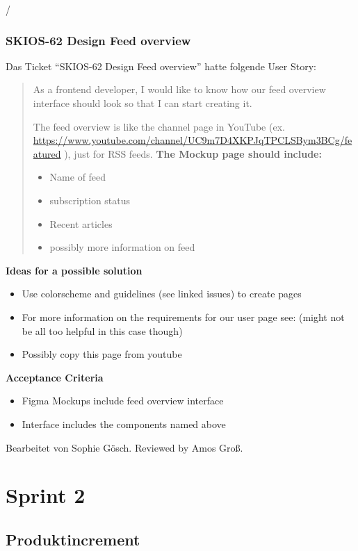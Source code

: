 /\subsubsection{SKIOS-62 Design Feed overview}
Das Ticket \enquote{SKIOS-62 Design Feed overview} hatte folgende User Story:
\begin{quotation}
    As a frontend developer, I would like to know how our feed overview interface should look so that I can start creating it.

    The feed overview is like the channel page in YouTube (ex. \url{https://www.youtube.com/channel/UC9m7D4XKPJqTPCLSBym3BCg/featured} ), just for RSS feeds.
    \textbf{The Mockup page should include:}
        \begin{itemize}
            \item Name of feed
            \item subscription status
            \item Recent articles
            \item possibly more information on feed
        \end{itemize}
\end{quotation}
\textbf{Ideas for a possible solution}
    \begin{itemize}
        \item Use colorscheme and guidelines (see linked issues) to create pages
        \item For more information on the requirements for our user page see:  (might not be all too helpful in this case though)
        \item Possibly copy this page from youtube
    \end{itemize}
\textbf{Acceptance Criteria}
    \begin{itemize}
        \item Figma Mockups include feed overview interface
        \item Interface includes the components named above
    \end{itemize}
Bearbeitet von Sophie Gösch.
Reviewed by Amos Groß.

\section{Sprint 2}
\subsection{Produktincrement}
